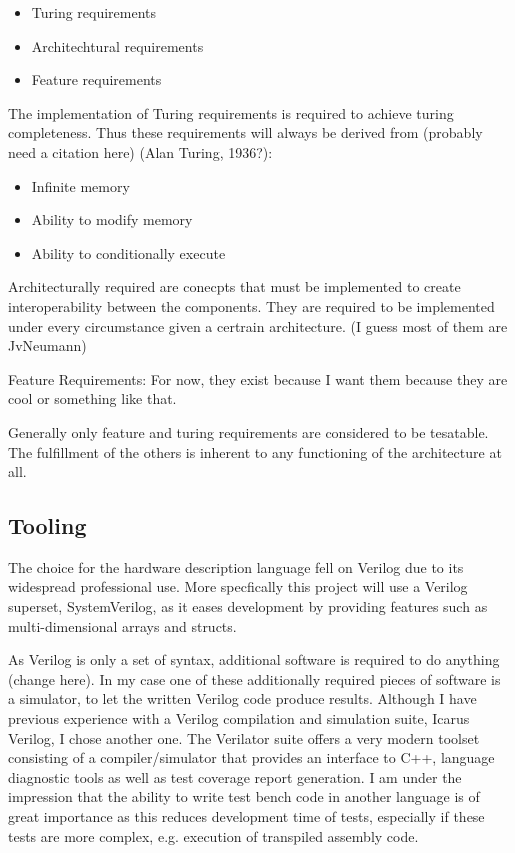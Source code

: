 \begin{itemize}
  \item Turing requirements
  \item Architechtural requirements
  \item Feature requirements
\end{itemize}


\newtheorem{turing-requirement}{Turing Req.}[subsection]
The implementation of Turing requirements is required to achieve turing completeness. Thus these requirements will always be derived from (probably need a citation here) (Alan Turing, 1936?): 
\begin{itemize}
  \item Infinite memory
  \item Ability to modify memory
  \item Ability to conditionally execute
\end{itemize}

\newtheorem{arch-requirement}{Arch. Req.}[subsection]
Architecturally required are conecpts that must be implemented to create interoperability between the components. They are required to be implemented under every circumstance given a certrain architecture. (I guess most of them are JvNeumann)

\newtheorem{feat-requirement}{Feat. Req.}[subsection]
Feature Requirements: For now, they exist because I want them because they are cool or something like that.


Generally only feature and turing requirements are considered to be tesatable. The fulfillment of the others is inherent to any functioning of the architecture at all. 

\subsection{Tooling}

The choice for the hardware description language fell on Verilog due to its widespread professional use. More specfically this project will use a Verilog superset, SystemVerilog, as it eases development by providing features such as multi-dimensional arrays and structs. 

As Verilog is only a set of syntax, additional software is required to do anything (change here). In my case one of these additionally required pieces of software is a simulator, to let the written Verilog code produce results. Although I have previous experience with a Verilog compilation and simulation suite, Icarus Verilog, I chose another one. The Verilator suite offers a very modern toolset consisting of a compiler/simulator that provides an interface to C++, language diagnostic tools as well as test coverage report generation. I am under the impression that the ability to write test bench code in another language is of great importance as this reduces development time of tests, especially if these tests are more complex, e.g. execution of transpiled assembly code. 

